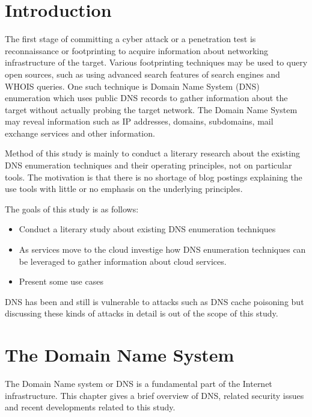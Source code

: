 
\section{Introduction}

The first stage of committing a cyber attack or a penetration test is reconnaissance or footprinting to acquire information about networking infrastructure of the target. Various footprinting techniques may be used to query open sources, such as using advanced search features of search engines and WHOIS queries. One such technique is Domain Name System (DNS) enumeration which uses public DNS records to gather information about the target without actually probing the target network. The Domain Name System may reveal information such as IP addresses, domains, subdomains, mail exchange services and other information. 

Method of this study is mainly to conduct a literary research about the existing DNS enumeration techniques and their operating principles, not on particular tools. The motivation is that there is no shortage of blog postings explaining the use tools with little or no emphasis on the underlying principles.

The goals of this study is as follows:

\begin{itemize}
 \item Conduct a literary study about existing DNS enumeration techniques
 \item As services move to the cloud investige how DNS enumeration techniques can be leveraged to 
 gather information about cloud services.
 \item Present some use cases
\end{itemize}

DNS has been and still is vulnerable to attacks such as DNS cache poisoning but discussing these kinds of attacks in detail is out of the scope of this study.

\section{The Domain Name System}

The Domain Name system or DNS is a fundamental part of the Internet infrastructure. This chapter gives a brief overview of DNS, related security issues and recent developments related to this study.

